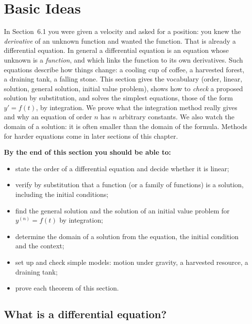 \documentclass[11pt]{article}
\begin{document}
\section{Basic Ideas}

\begin{guide}
In Section~6.1 you were given a velocity and asked for a position: you knew the \emph{derivative} of an unknown function and wanted the function. That is already a differential equation. In general a differential equation is an equation whose unknown is a \emph{function}, and which links the function to its own derivatives. Such equations describe how things change: a cooling cup of coffee, a harvested forest, a draining tank, a falling stone. This section gives the vocabulary (order, linear, solution, general solution, initial value problem), shows how to \emph{check} a proposed solution by substitution, and solves the simplest equations, those of the form $y'=f(t)$, by integration. We prove what the integration method really gives and why an equation of order $n$ has $n$ arbitrary constants. We also watch the domain of a solution: it is often smaller than the domain of the formula. Methods for harder equations come in later sections of this chapter.
\end{guide}

\textbf{By the end of this section you should be able to:}
\begin{itemize}
  \item state the order of a differential equation and decide whether it is linear;
  \item verify by substitution that a function (or a family of functions) is a solution, including the initial conditions;
  \item find the general solution and the solution of an initial value problem for $y^{(n)}=f(t)$ by integration;
  \item determine the domain of a solution from the equation, the initial condition and the context;
  \item set up and check simple models: motion under gravity, a harvested resource, a draining tank;
  \item prove each theorem of this section.
\end{itemize}

\subsection*{What is a differential equation?}
\end{document}
